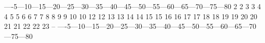 
\begin{fssl}
----5---10---15---20---25---30---35---40---45---50---55---60---65---70---75---80
 2                                                                             2
 3                                                                             3
 4                                                                             4
 5                                                                             5
 6                                                                             6
 7                                                                             7
 8                                                                             8
 9                                                                             9
10                                                                            10
12                                                                            12
13                                                                            13
14                                                                            14
15                                                                            15
16                                                                            16
17                                                                            17
18                                                                            18
19                                                                            19
20                                                                            20
21                                                                            21
22                                                                            22
23                                                                            --
----5---10---15---20---25---30---35---40---45---50---55---60---65---70---75---80
\end{fssl}
